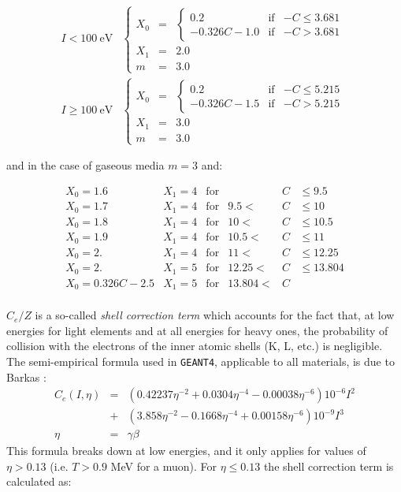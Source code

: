 \[
\begin{array}{ll}
I < 100 \: \mbox{eV} & \left \{
\begin{array}{lcl}
X_{0} & = & \left \{
\begin{array}{lll}
0.2 & \mbox{if} & -C \leq 3.681 \\
-0.326C-1.0 & \mbox{if} & -C > 3.681
\end{array} \right . \\
X_{1} & = & 2.0 \\
m & = & 3.0
\end{array} \right . \\ [1.0cm]
I \geq 100 \: \mbox{eV} & \left \{
\begin{array}{lcl}
X_{0} & = & \left \{
\begin{array}{lll}
0.2 & \mbox{if} & -C \leq 5.215 \\
-0.326C-1.5 & \mbox{if} & -C > 5.215
\end{array} \right . \\
X_{1} & = & 3.0 \\
m & = & 3.0
\end{array} \right .
\end{array}
\]

and in the case of gaseous media $m=3$ and:

\[
\begin{array}{llcrcl}
X_0 = 1.6 & X_1 = 4 & \mbox{for} &       & C & \leq 9.5 \\
X_0 = 1.7 & X_1 = 4 & \mbox{for} & 9.5 < & C & \leq 10 \\
X_0 = 1.8 & X_1 = 4 & \mbox{for} & 10  < & C & \leq 10.5 \\
X_0 = 1.9 & X_1 = 4 & \mbox{for} & 10.5 < & C & \leq 11 \\
X_0 = 2.  & X_1 = 4 & \mbox{for} & 11  < & C & \leq 12.25 \\
X_0 = 2.  & X_1 = 5 & \mbox{for} & 12.25 < & C & \leq 13.804 \\
X_0 = 0.326C-2.5 & X_1 = 5 & \mbox{for} & 13.804 < & C &  \\
\end{array}
\]

$C_e/Z$ is a so-called {\it shell correction term}
which accounts for the fact that, at
low energies for light elements and at all energies for heavy ones, the
probability of collision with the electrons of the inner atomic shells
(K, L, etc.) is negligible. The semi-empirical formula used in
{\tt GEANT4}, applicable to all materials, is due to Barkas \cite{hion.barkas}:
\begin{eqnarray*}
\label{muion.e}
 C_e(I,\eta) & = & (0.42237\eta^{-2}+0.0304\eta^{-4}-0.00038\eta^{-6})
10^{-6} I^2 \\
& +& (3.858\eta^{-2}-0.1668\eta^{-4}+0.00158\eta^{-6})10^{-9}I^3 \\
\eta & = &  \gamma \beta
\end{eqnarray*}
This formula breaks down at low energies, and it only applies for values
of $\eta > 0.13$ (i.e. $T > 0.9$ MeV for a muon). For $\eta \leq
0.13$ the shell correction term is calculated as:

